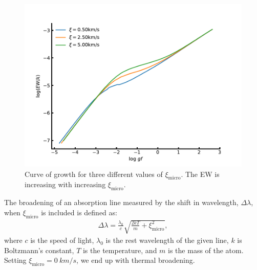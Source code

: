 {\begin{figure}[htpb!]
    \centering
    \includegraphics[width=0.85\linewidth]{figures/cog_vt.pdf}
    \caption{Curve of growth for three different values of $\xi_\mathrm{micro}$. The EW is
             increasing with increasing $\xi_\mathrm{micro}$.}
    \label{fig:cog_vt}
\end{figure}

The broadening of an absorption line measured by the shift in wavelength, $\Delta\lambda$, when
$\xi_\mathrm{micro}$ is included is defined as:
\begin{align}
  \Delta\lambda = \frac{\lambda_0}{c} \sqrt{\frac{2kT}{m} + \xi_\mathrm{micro}^2},
\end{align}
where $c$ is the speed of light, $\lambda_0$ is the rest wavelength of the given line, $k$ is
Boltzmann's constant, $T$ is the temperature, and $m$ is the mass of the atom. Setting
$\xi_\mathrm{micro}=\SI{0}{km/s}$, we end up with thermal broadening.


}
